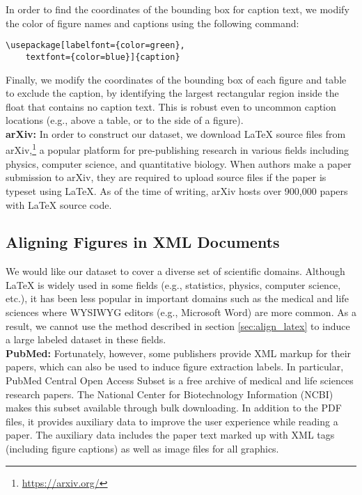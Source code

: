 \documentclass[sigconf]{acmart}
\begin{document}
In order to find the coordinates of the bounding box for caption text, we modify the color of figure names and captions using the following command:
\begin{verbatim}
\usepackage[labelfont={color=green},
    textfont={color=blue}]{caption} 
\end{verbatim}

Finally, we modify the coordinates of the bounding box of each figure and table to exclude the caption, by identifying the largest rectangular region inside the float that contains no caption text.
This is robust even to uncommon caption locations (e.g., above a table, or to the side of a figure).
\\[15pt]\textbf{arXiv:}%
In order to construct our dataset, we download LaTeX source files from arXiv,\footnote{\url{https://arxiv.org/}} a popular platform for pre-publishing research in various fields including physics, computer science, and quantitative biology.
When authors make a paper submission to arXiv, they are required to upload source files if the paper is typeset using LaTeX.
As of the time of writing, arXiv hosts over 900,000 papers with LaTeX source code. 

\subsection{Aligning Figures in XML Documents}%
We would like our dataset to cover a diverse set of scientific domains.
Although LaTeX is widely used in some fields (e.g., statistics, physics, computer science, etc.), it has been less popular in important domains such as the medical and life sciences where WYSIWYG editors (e.g., Microsoft Word) are more common. 
As a result, we cannot use the method described in section \ref{sec:align_latex} to induce a large labeled dataset in these fields.
\\[15pt]\textbf{PubMed:}%
Fortunately, however, some publishers provide XML markup for their papers, which can also be used to induce figure extraction labels. 
In particular, PubMed Central Open Access Subset is a free archive of medical and life sciences research papers. 
The National Center for Biotechnology Information (NCBI) makes this subset available through bulk downloading.
In addition to the PDF files, it provides auxiliary data to improve the user experience while reading a paper. 
The auxiliary data includes the paper text marked up with XML tags (including figure captions) as well as image files for all graphics. 
\end{document}
